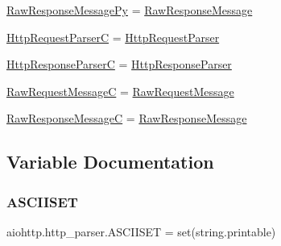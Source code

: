 \begin{DoxyCompactItemize}
$$\hyperlink{namespaceaiohttp_1_1http__parser_a2383bb15d297b953d96e4dba2801c1e0}{Raw\+Response\+Message\+Py} = \hyperlink{namespaceaiohttp_1_1http__parser_a9963bd217f7dd3de0c17e121b8b0d4fa}{Raw\+Response\+Message}
\item 
\hyperlink{namespaceaiohttp_1_1http__parser_ae1f20b234bba6348c2e48404548d20a6}{Http\+Request\+ParserC} = \hyperlink{classaiohttp_1_1http__parser_1_1_http_request_parser}{Http\+Request\+Parser}
\item 
\hyperlink{namespaceaiohttp_1_1http__parser_af158422507c5a9570b474fd4ece7d9c9}{Http\+Response\+ParserC} = \hyperlink{classaiohttp_1_1http__parser_1_1_http_response_parser}{Http\+Response\+Parser}
\item 
\hyperlink{namespaceaiohttp_1_1http__parser_a7f562f3a7257700351e9b4ff57753a0e}{Raw\+Request\+MessageC} = \hyperlink{namespaceaiohttp_1_1http__parser_a4145f5fa947ac335040e980b0dca95b4}{Raw\+Request\+Message}
\item 
\hyperlink{namespaceaiohttp_1_1http__parser_ab93f5698e1ece0a0fa957ea89ed37556}{Raw\+Response\+MessageC} = \hyperlink{namespaceaiohttp_1_1http__parser_a9963bd217f7dd3de0c17e121b8b0d4fa}{Raw\+Response\+Message}
\end{DoxyCompactItemize}


\subsection{Variable Documentation}
\mbox{\label{namespaceaiohttp_1_1http__parser_ad34d8c557c54ddce20f2faa48d2e0de1}} 
\subsubsection{\texorpdfstring{A\+S\+C\+I\+I\+S\+ET}{ASCIISET}}
{\footnotesize\ttfamily aiohttp.\+http\+\_\+parser.\+A\+S\+C\+I\+I\+S\+ET = set(string.\+printable)}

\mbox{\label{namespaceaiohttp_1_1http__parser_a682a305227344337395db6b0cbb71c2e}} 
